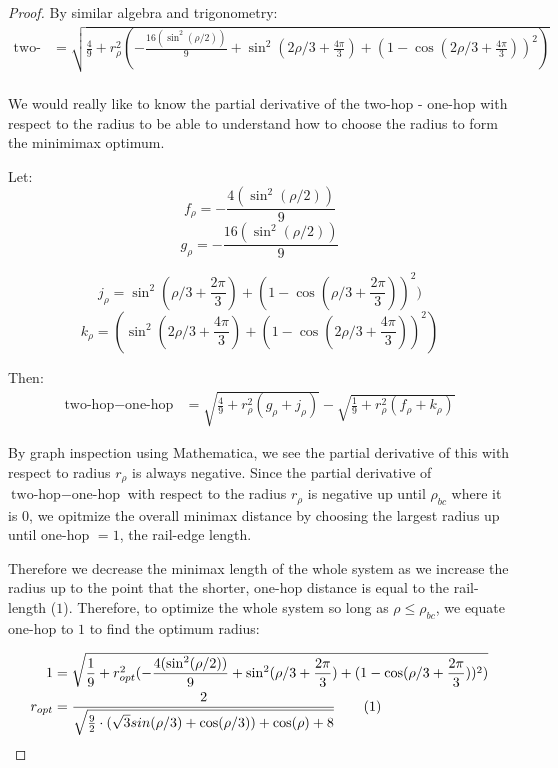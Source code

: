 \documentclass[11pt]{article}
\newcommand\numberthis{\addtocounter{equation}{1}\tag{\theequation}}
\begin{document}
\begin{proof}
By similar algebra and trigonometry:
\begin{align*}
  \text{two-hop}  &= \sqrt{\frac{4}{9} + r_{\rho}^2 (-\frac{16 (\sin^2( \rho / 2))}{9} + \sin^2(2\rho/3 + \frac{4\pi}{3})  + (1 - \cos(2\rho/3 + \frac{4\pi}{3}))^2)} \\
\end{align*}

We would really like to know the partial derivative of the two-hop - one-hop with respect
to the radius to be able to understand how to choose the radius to form the minimimax optimum.

Let:
\begin{equation}
  f_{\rho} = -\frac{4 (\sin^2( \rho / 2))}{9}
  \end{equation}
\begin{equation}
  g_{\rho} = -\frac{16 (\sin^2( \rho / 2))}{9} 
\end{equation}

\begin{equation}
  j_{\rho} = \sin^2(\rho/3+ \frac{2\pi}{3})  + (1 - \cos(\rho/3 + \frac{2\pi}{3}))^2)
\end{equation}
\begin{equation}
  k_{\rho} = (\sin^2(2\rho/3 + \frac{4\pi}{3})  + (1 - \cos(2\rho/3 + \frac{4\pi}{3}))^2)
\end{equation}

Then:
\begin{align*}
  \text{two-hop} - \text{one-hop}  &= \sqrt{\frac{4}{9}  + r_{\rho}^2(g_{\rho}+ j_{\rho})}
  - \sqrt{\frac{1}{9} +r_{\rho}^2(f_{\rho}+k_{\rho}) }
\end{align*}



By graph inspection using Mathematica, we see the partial derivative of this with respect to
radius $r_{\rho}$ is always negative.
Since the partial derivative of $\text{two-hop} - \text{one-hop}$ with respect to the
radius $r_{\rho}$ is negative up until $\rho_{bc}$ where it is $0$, 
we opitmize the overall minimax distance by choosing the largest radius
up until one-hop $= 1$, the rail-edge length.

Therefore we decrease the minimax length
of the whole system as we increase the radius
up to the point that the shorter, one-hop distance is equal to the rail-length ($1$).
Therefore, to optimize the whole system so long as $\rho \leq \rho_{bc}$,
we equate one-hop to $1$ to find the optimum radius:


\begin{align*}
  1 &=  \sqrt{\frac{1}{9}  + r_{opt}^2(-\frac{4 (\sin^2( \rho / 2))}{9} + \sin^2(\rho/3+ \frac{2\pi}{3})  + (1 - \cos(\rho/3 + \frac{2\pi}{3}))^2)} \\
  r_{opt} &= \frac{2}{\sqrt{\frac{9}{2} \cdot ( \sqrt{3} sin(\rho/3) + \cos(\rho/3)) + \cos(\rho)+ 8 }} \numberthis  \label{eqrhoopt} \\
\end{align*}


\end{proof}
\end{document}
